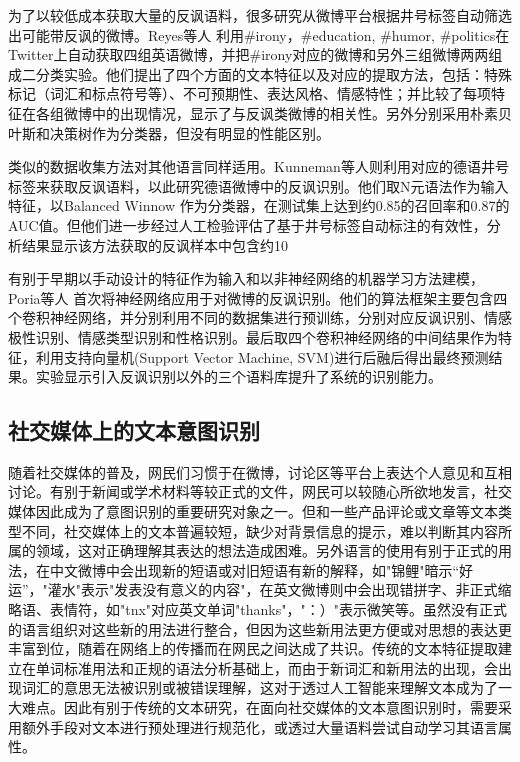 为了以较低成本获取大量的反讽语料，很多研究从微博平台根据井号标签自动筛选出可能带反讽的微博。Reyes等人 \cite{reyes2013multidimensional} 利用\#irony，\#education, \#humor, \#politics在Twitter上自动获取四组英语微博，并把\#irony对应的微博和另外三组微博两两组成二分类实验。他们提出了四个方面的文本特征以及对应的提取方法，包括：特殊标记（词汇和标点符号等）、不可预期性、表达风格、情感特性；并比较了每项特征在各组微博中的出现情况，显示了与反讽类微博的相关性。另外分别采用朴素贝叶斯和决策树作为分类器，但没有明显的性能区别。

类似的数据收集方法对其他语言同样适用。Kunneman等人\cite{kunneman2015signaling}则利用对应的德语井号标签来获取反讽语料，以此研究德语微博中的反讽识别。他们取N元语法作为输入特征，以Balanced Winnow \cite{littlestone1988learning}作为分类器，在测试集上达到约0.85的召回率和0.87的AUC值。但他们进一步经过人工检验评估了基于井号标签自动标注的有效性，分析结果显示该方法获取的反讽样本中包含约10%

有别于早期以手动设计的特征作为输入和以非神经网络的机器学习方法建模，Poria等人 \cite{poria2016deeper} 首次将神经网络应用于对微博的反讽识别。他们的算法框架主要包含四个卷积神经网络，并分别利用不同的数据集进行预训练，分别对应反讽识别、情感极性识别、情感类型识别和性格识别。最后取四个卷积神经网络的中间结果作为特征，利用支持向量机(Support Vector Machine, SVM)进行后融后得出最终预测结果。实验显示引入反讽识别以外的三个语料库提升了系统的识别能力。

\subsection{社交媒体上的文本意图识别}

随着社交媒体的普及，网民们习惯于在微博，讨论区等平台上表达个人意见和互相讨论。有别于新闻或学术材料等较正式的文件，网民可以较随心所欲地发言，社交媒体因此成为了意图识别的重要研究对象之一。但和一些产品评论或文章等文本类型不同，社交媒体上的文本普遍较短\cite{Madhusudhanan2018survey}，缺少对背景信息的提示，难以判断其内容所属的领域，这对正确理解其表达的想法造成困难。另外语言的使用有别于正式的用法，在中文微博中会出现新的短语或对旧短语有新的解释\cite{xie2012jiyu}，如"锦鲤"暗示“好运”，"灌水"表示"发表没有意义的内容"，在英文微博则中会出现错拼字、非正式缩略语、表情符\cite{go2009twitter}\cite{paltoglou2012twitter}，如"tnx"对应英文单词"thanks"，"：）"表示微笑等。虽然没有正式的语言组织对这些新的用法进行整合，但因为这些新用法更方便或对思想的表达更丰富到位，随着在网络上的传播而在网民之间达成了共识。传统的文本特征提取建立在单词标准用法和正规的语法分析基础上，而由于新词汇和新用法的出现，会出现词汇的意思无法被识别或被错误理解，这对于透过人工智能来理解文本成为了一大难点。因此有别于传统的文本研究，在面向社交媒体的文本意图识别时，需要采用额外手段对文本进行预处理进行规范化，或透过大量语料尝试自动学习其语言属性。

